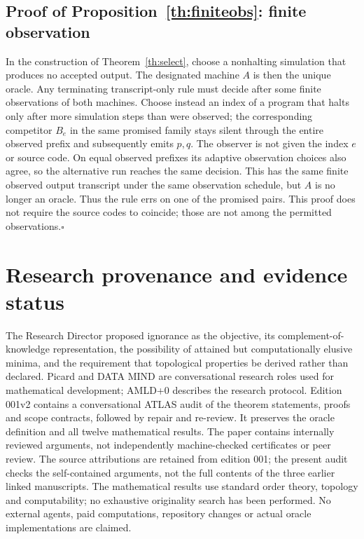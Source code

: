 \documentclass[11pt]{article}
\begin{document}
\subsection{Proof of Proposition~\ref{th:finiteobs}: finite observation}
In the construction of Theorem~\ref{th:select}, choose a nonhalting simulation that produces no accepted output. The designated machine $A$ is then the unique oracle. Any terminating transcript-only rule must decide after some finite observations of both machines. Choose instead an index of a program that halts only after more simulation steps than were observed; the corresponding competitor $B_e$ in the same promised family stays silent through the entire observed prefix and subsequently emits $p,q$. The observer is not given the index $e$ or source code. On equal observed prefixes its adaptive observation choices also agree, so the alternative run reaches the same decision. This has the same finite observed output transcript under the same observation schedule, but $A$ is no longer an oracle. Thus the rule errs on one of the promised pairs. This proof does not require the source codes to coincide; those are not among the permitted observations.\hfill$\square$

\section*{Research provenance and evidence status}
The Research Director proposed ignorance as the objective, its complement-of-knowledge representation, the possibility of attained but computationally elusive minima, and the requirement that topological properties be derived rather than declared. Picard and DATA MIND are conversational research roles used for mathematical development; AMLD+0 describes the research protocol. Edition 001v2 contains a conversational ATLAS audit of the theorem statements, proofs and scope contracts, followed by repair and re-review. It preserves the oracle definition and all twelve mathematical results. The paper contains internally reviewed arguments, not independently machine-checked certificates or peer review. The source attributions are retained from edition 001; the present audit checks the self-contained arguments, not the full contents of the three earlier linked manuscripts. The mathematical results use standard order theory, topology and computability; no exhaustive originality search has been performed. No external agents, paid computations, repository changes or actual oracle implementations are claimed.
\end{document}
